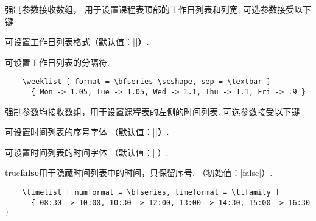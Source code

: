 \documentclass[svgnames]{l3doc}
\def \TFF {true\textup{\textbar\underline{\textbf{false}}}}
\begin{document}
\begin{documentation}
\begin{function}{\weeklist}
  \begin{syntax}
       
  \end{syntax}
  强制参数接收数组，
  用于设置课程表顶部的工作日列表和列宽.
  可选参数接受以下键
  \begin{keyval}
    \item [\key{format}] 
    可设置工作日列表格式（默认值：|\bfseries|）.
    \item [\key{sep}] 
    可设置工作日列表的分隔符.
  \end{keyval}
  \begin{verbatim}
    \weeklist [ format = \bfseries \scshape, sep = \textbar ]
      { Mon -> 1.05, Tue -> 1.05, Wed -> 1.1, Thu -> 1.1, Fri -> .9 }
  \end{verbatim}
\end{function}

\begin{function}{\timelist}
  \begin{syntax}
       
  \end{syntax}
  强制参数均接收数组，用于设置课程表的左侧的时间列表.
  可选参数接受以下键
  \begin{keyval}
    \item [\key{numformat}] 
    可设置时间列表的序号字体
    （默认值：|\ttfamily \bfseries|）.
    \item [\key{timefont}]  可设置时间列表的时间字体
    （默认值：|\ttfamily|）.
    \item [\key{hidetime}] \val\TFF 用于隐藏时间列表中的时间，只保留序号.
    （初始值：|false|）.
  \end{keyval}
  \begin{verbatim}
    \timelist [ numformat = \bfseries, timeformat = \ttfamily ]
      { 08:30 -> 10:00, 10:30 -> 12:00, 13:00 -> 14:30, 15:00 -> 16:30 }
  \end{verbatim}
\end{function}


\end{documentation}
\end{document}
